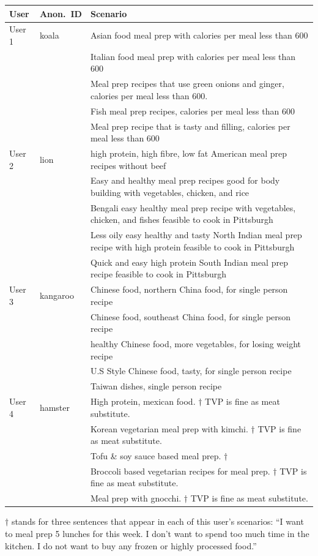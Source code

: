\documentclass[11pt]{article}
\renewcommand{\arraystretch}{1.32}
\newcommand{\hd}[1]{\leavevmode\sffamily\bfseries\color{ink}#1}
\begin{document}
{\footnotesize\renewcommand{\arraystretch}{1.2}
\begin{longtable}{P{1.6cm} P{1.5cm} P{12.1cm}}
\toprule
{} \hd{User} & \hd{Anon.\ ID} & \hd{Scenario} \\
\midrule
\endhead
\bottomrule
\endlastfoot
User 1 & koala & Asian food meal prep with calories per meal less than 600 \\
      & & Italian food meal prep with calories per meal less than 600 \\
      & & Meal prep recipes that use green onions and ginger, calories per meal less than 600. \\
      & & Fish meal prep recipes, calories per meal less than 600 \\
      & & Meal prep recipe that is tasty and filling, calories per meal less than 600 \\
\midrule
User 2 & lion & high protein, high fibre, low fat American meal prep recipes without beef \\
      & & Easy and healthy meal prep recipes good for body building with vegetables, chicken, and rice \\
      & & Bengali easy healthy meal prep recipe with vegetables, chicken, and fishes feasible to cook in Pittsburgh \\
      & & Less oily easy healthy and tasty North Indian meal prep recipe with high protein feasible to cook in Pittsburgh \\
      & & Quick and easy high protein South Indian meal prep recipe feasible to cook in Pittsburgh \\
\midrule
User 3 & kangaroo & Chinese food, northern China food, for single person recipe \\
      & & Chinese food, southeast China food, for single person recipe \\
      & & healthy Chinese food, more vegetables, for losing weight recipe \\
      & & U.S Style Chinese food, tasty, for single person recipe \\
      & & Taiwan dishes, single person recipe \\
\midrule
User 4 & hamster & High protein, mexican food. $\dagger$ TVP is fine as meat substitute. \\
      & & Korean vegetarian meal prep with kimchi. $\dagger$ TVP is fine as meat substitute. \\
      & & Tofu \& soy sauce based meal prep. $\dagger$ \\
      & & Broccoli based vegetarian recipes for meal prep. $\dagger$ TVP is fine as meat substitute. \\
      & & Meal prep with gnocchi. $\dagger$ TVP is fine as meat substitute. \\
\end{longtable}
}
\vspace{-6pt}
{\footnotesize $\dagger$ stands for three sentences that appear in each of this user's scenarios:
``I want to meal prep 5 lunches for this week. I don't want to spend too much time in the kitchen.
I do not want to buy any frozen or highly processed food.''\par}
\addtocounter{table}{-1}
\end{document}
